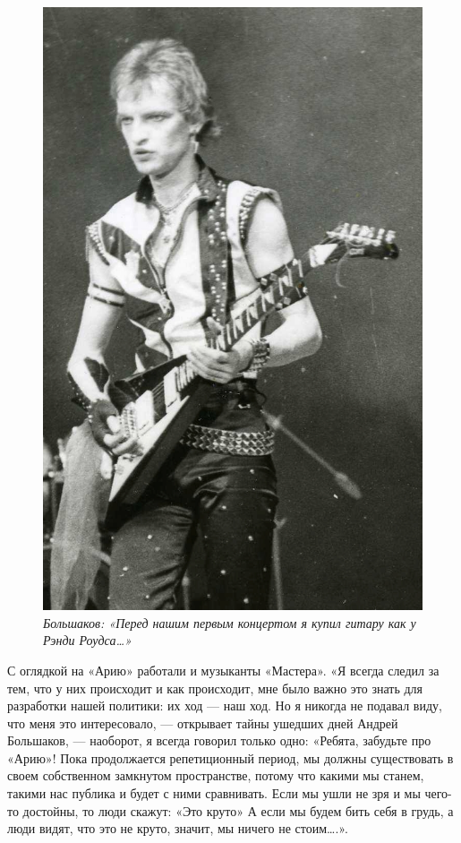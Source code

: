 \documentclass[16pt,a5paper,oneside]{book}
\begin{document}
\begin{figure}
    \centering
    \includegraphics[scale=0.9]{Image17}
    \caption{\textit{Большаков: «Перед нашим первым концертом я купил гитару как у Рэнди Роудса\ldots»}}
\end{figure}

С оглядкой на «Арию» работали и музыканты «Мастера». «Я всегда следил за тем, что у них происходит и как происходит, мне
было важно это знать для разработки нашей политики: их ход — наш ход. Но я никогда не подавал виду, что меня это
интересовало, — открывает тайны ушедших дней Андрей Большаков, — наоборот, я всегда говорил только одно: «Ребята,
забудьте про «Арию»! Пока продолжается репетиционный период, мы должны существовать в своем собственном замкнутом
пространстве, потому что какими мы станем, такими нас публика и будет с ними сравнивать. Если мы ушли не зря и мы
чего-то достойны, то люди скажут: «Это круто» А если мы будем бить себя в грудь, а люди видят, что это не круто, значит,
мы ничего не стоим\ldots.».
\end{document}
